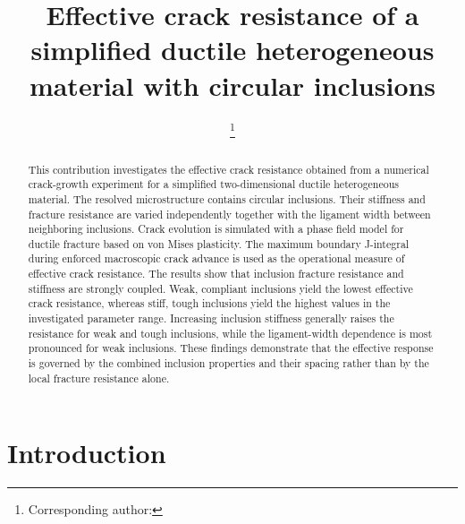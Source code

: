 \documentclass[pamm,a4paper,fleqn]{w-art}
\begin{document}
\TitleLanguage[EN]
\title[Effective crack resistance with circular inclusions]%
{Effective crack resistance of a simplified ductile
  heterogeneous material with circular inclusions}

\author{ %
  \footnote{Corresponding author:
    }}

\author{ }
\author{ }

\address[\inst{1}]{\CountryCode[DE]Institut f\"ur Mechanik,
  FB Bau- und Umweltingenieurwissenschaften, TU Darmstadt,
  Franziska-Braun-Stra{\ss}e 7, 64287 Darmstadt, Germany}

\AbstractLanguage[EN]
\begin{abstract}
  This contribution investigates the effective crack resistance
  obtained from a numerical crack-growth experiment for a simplified
  two-dimensional ductile heterogeneous material. The resolved
  microstructure contains circular inclusions. Their stiffness and
  fracture resistance are varied independently together with the
  ligament width between neighboring inclusions. Crack evolution is
  simulated with a phase field model for ductile fracture based on
  von Mises plasticity. The maximum boundary J-integral during
  enforced macroscopic crack advance is used as the operational
  measure of effective crack resistance. The results show that
  inclusion fracture resistance and stiffness are strongly coupled.
  Weak, compliant inclusions yield the lowest effective crack
  resistance, whereas stiff, tough inclusions yield the highest
  values in the investigated parameter range. Increasing inclusion
  stiffness generally raises the resistance for weak and tough
  inclusions, while the ligament-width dependence is most pronounced
  for weak inclusions. These findings demonstrate that the effective
  response is governed by the combined inclusion properties and their
  spacing rather than by the local fracture resistance alone.
\end{abstract}

\maketitle

\section{Introduction}\label{sec:intro}
\end{document}
